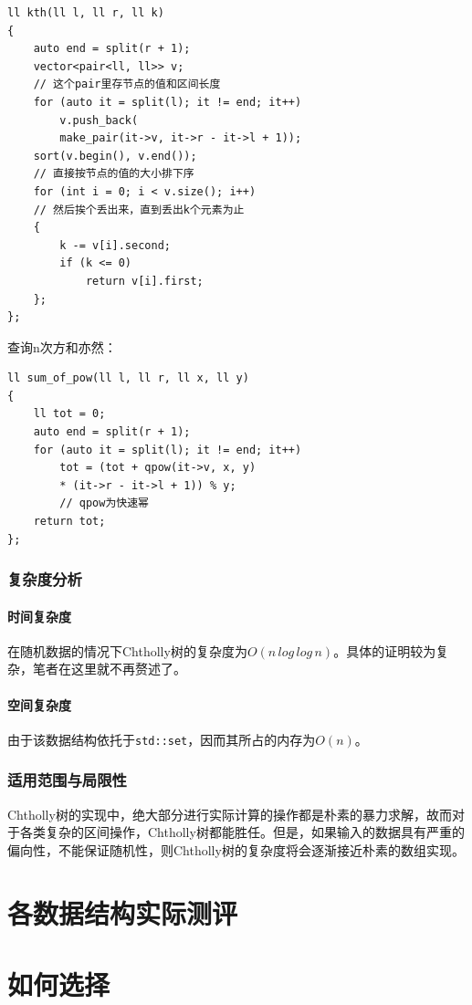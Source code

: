 \documentclass{cjc}
\begin{document}
\begin{lstlisting}
ll kth(ll l, ll r, ll k)
{
    auto end = split(r + 1);
    vector<pair<ll, ll>> v; 
    // 这个pair里存节点的值和区间长度
    for (auto it = split(l); it != end; it++)
        v.push_back(
        make_pair(it->v, it->r - it->l + 1));
    sort(v.begin(), v.end()); 
    // 直接按节点的值的大小排下序
    for (int i = 0; i < v.size(); i++) 
    // 然后挨个丢出来，直到丢出k个元素为止
    {
        k -= v[i].second;
        if (k <= 0)
            return v[i].first;
    };
};
\end{lstlisting}
查询n次方和亦然：
\begin{lstlisting}
ll sum_of_pow(ll l, ll r, ll x, ll y)
{
    ll tot = 0;
    auto end = split(r + 1);
    for (auto it = split(l); it != end; it++)
        tot = (tot + qpow(it->v, x, y) 
        * (it->r - it->l + 1)) % y; 
        // qpow为快速幂
    return tot;
};
\end{lstlisting}

\subsubsection{复杂度分析}
\paragraph{时间复杂度} 在随机数据的情况下Chtholly树的复杂度为$O(n\,log\,log\,n)$。具体的证明较为复杂，笔者在这里就不再赘述了。
\paragraph{空间复杂度} 由于该数据结构依托于\lstinline{std::set}，因而其所占的内存为$O(n)$。
\subsubsection{适用范围与局限性}
Chtholly树的实现中，绝大部分进行实际计算的操作都是朴素的暴力求解，故而对于各类复杂的区间操作，Chtholly树都能胜任。但是，如果输入的数据具有严重的偏向性，不能保证随机性，则Chtholly树的复杂度将会逐渐接近朴素的数组实现。

\section{各数据结构实际测评}

\section{如何选择}
\end{document}
